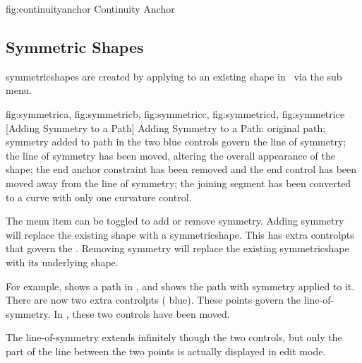 \FloatFig
  {fig:continuityanchor}
   {}
   {Continuity Anchor}


\subsection{Symmetric Shapes}\label{sec:symmetric}

\Glspl{symmetricshape} are created by applying
 to an existing \gls{shape} in 
\editpathmode\ via the  sub menu.

{
  {fig:symmetrica}{}{},
  {fig:symmetricb}{}{},
  {fig:symmetricc}{}{},
  {fig:symmetricd}{}{},
  {fig:symmetrice}{}{}
}
[Adding Symmetry to a Path]
{Adding Symmetry to a Path:  original path;
 symmetry added to path in  the
two blue controls govern the line of symmetry;
 the line of symmetry has been moved, altering the
overall appearance of the shape;  the end anchor
constraint has been removed and the end control has been moved
away from the line of symmetry;  the joining segment
has been converted to a curve with only one curvature control.}


The  menu item can be toggled
to add or remove \gls{symmetry}. Adding symmetry will replace the existing
\gls{shape} with a \gls{symmetricshape}. This has extra
\glspl{controlpt} that govern the .
Removing \gls{symmetry} will replace the existing \gls{symmetricshape}
with its underlying \gls{shape}.

For example,  shows a \gls*{path}
in \editpathmode, and  shows the
path with \gls{symmetry} applied to it. There are now two extra
\glspl{controlpt} ( blue). These points govern the 
\gls{line-of-symmetry}. In , these two controls
have been moved.

\begin{information}
The \gls{line-of-symmetry} extends infinitely though the two controls,
but only the part of the line between the two points is actually
displayed in edit mode.
\end{information}

